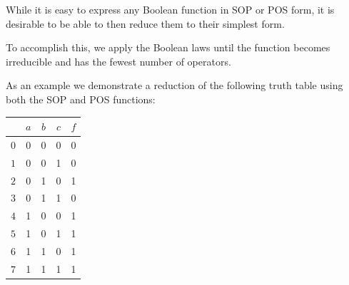 \documentclass[10pt]{article}
\begin{document}
While it is easy to express any Boolean function in SOP or POS form, it is 
desirable to be able to then reduce them to their simplest form.

To accomplish this, we apply the Boolean laws until the function becomes irreducible and
has the fewest number of operators.

As an example we demonstrate a reduction of the following truth table 
using both the SOP and POS functions:

\begin{center}
\begin{tabular}{|c|ccc|c|}
	& $a$ & $b$ & $c$ & $f$ \\
\hline
$0$ & 0 & 0 & 0 &   0\\
$1$ & 0 & 0 & 1 &   0\\
$2$ & 0 & 1 & 0 &   1\\
$3$ & 0 & 1 & 1 &   0\\
$4$ & 1 & 0 & 0 &   1\\
$5$ & 1 & 0 & 1 &   1\\
$6$ & 1 & 1 & 0 &   1\\
$7$ & 1 & 1 & 1 &   1\\
\hline
\end{tabular}
\end{center}
\end{document}
